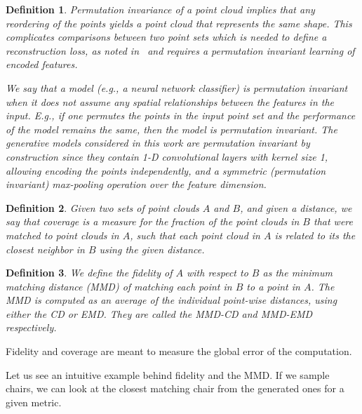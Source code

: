 \documentclass[12pt]{article}
\newtheorem{definition}{Definition}
\begin{document}
    \begin{definition}
        \normalfont
        \textit{Permutation invariance} of a point cloud implies that any reordering of the points yields a point cloud that represents the same shape. This complicates comparisons between two point sets which is needed to define a reconstruction loss, as noted in~\cite{pmlr-v80-achlioptas18a} and requires a permutation invariant learning of encoded features.

        We say that a model (e.g., a neural network classifier) is \emph{permutation invariant} when it does not assume any spatial relationships between the features in the input. E.g., if one permutes the points in the input point set and the performance of the model remains the same, then the model is permutation invariant.
        The generative models considered in this work are permutation invariant by construction since they contain 1-D convolutional layers with kernel size 1, allowing encoding the points \textit{independently}, and a symmetric (permutation invariant) max-pooling operation over the feature dimension.
    \end{definition}

    \begin{definition}
        \normalfont
        Given two sets of point clouds $A$ and $B$, and given a distance, we say that \emph{coverage} is a measure for the fraction of the point clouds in $B$ that were matched to point clouds in $A$, such that each point cloud in $A$ is related to its the closest neighbor in $B$ using the given distance.
    \end{definition}

    \begin{definition}
        \normalfont
        We define the \emph{fidelity} of $A$ with respect to $B$ as the \emph{minimum matching distance} (MMD) of matching each point in $B$ to a point in $A$.
        The \emph{MMD} is computed as an average of the individual point-wise distances, using either the CD or EMD.
        They are called the \emph{MMD-CD} and \emph{MMD-EMD} respectively.
    \end{definition}

    Fidelity and coverage are meant to measure the global error of the computation.

    Let us see an intuitive example behind fidelity and the MMD.
    If we sample chairs, we can look at the closest matching chair from the generated ones for a given metric.
\end{document}
